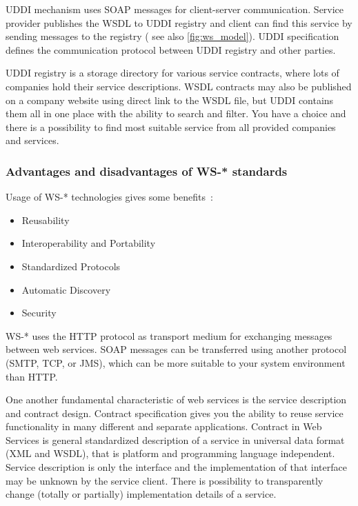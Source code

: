 \gls{UDDI} mechanism uses \gls{SOAP} messages for client-server communication. 
Service provider publishes the \gls{WSDL} to \gls{UDDI} registry and client can
find this service by sending messages to the registry ( see also 
\autoref{fig:ws_model}). \gls{UDDI} specification defines the communication
protocol between \gls{UDDI} registry and other parties.


\gls{UDDI} registry is a storage directory for various service contracts, where
lots of companies hold their service descriptions. \gls{WSDL} contracts may 
also be published on a company website using direct link to the \gls{WSDL} file,
but \gls{UDDI} contains them all in one place with the ability to search and
filter.
You have a choice and there is a possibility to find most suitable service
from all provided companies and services.



\subsubsection{Advantages and disadvantages of WS-* standards}
\label{sec:adv_and_disadv_of_ws_standards}
Usage of WS-* technologies gives some
benefits~\cite{ws_technologies_state_of_the_art}:

\begin{itemize}
  \item Reusability
  \item Interoperability and Portability
  \item Standardized Protocols
  \item Automatic Discovery
  \item Security
\end{itemize}

WS-* uses the \gls{HTTP} protocol as transport medium for exchanging messages
between web services. \gls{SOAP} messages can be transferred using another
protocol (\gls{SMTP}, \gls{TCP}, or \gls{JMS}), which can be more suitable to
your system environment than \gls{HTTP}.

One another fundamental characteristic of web services is the service
description and contract design. Contract specification gives you the ability to
reuse service functionality in many different and separate applications.
Contract in Web Services is general standardized description of a service in
universal data format (\gls{XML} and \gls{WSDL}), that is platform and programming language
independent. Service description is only the interface and the implementation
of that interface may be unknown by the service client. There is possibility to
transparently change (totally or partially) implementation details of a service.



